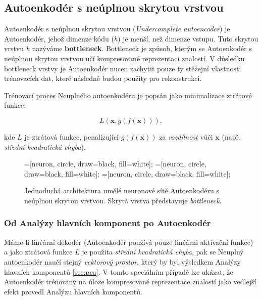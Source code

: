\subsection{Autoenkodér s neúplnou skrytou vrstvou}
\label{sec:undercomplete_autoencoder}
Autoenkodér s neúplnou skrytou vrstvou (\emph{Undercomplete autoencoder}) je Autoenkodér, jehož dimenze kódu (\emph{h}) je menší, než dimenze vstupu.
Tuto skrytou vrstvu \emph{h} nazýváme \textbf{bottleneck}. Bottleneck je způsob, kterým se Autoenkodér s neúplnou skrytou vrstvou učí kompresované reprezentaci znalostí. 
V důsledku bottleneck vrstvy je Autoenkodér nucen zachytit pouze ty stěžejní vlastnosti trénovacích dat, které následně budou použity pro rekonstrukci.

Trénovací proces Neuplného autoenkodéru je popsán jako minimalizace ztrátové funkce:

\begin{equation}
    L(\mathbf{x}, g(f(\mathbf{x}))),
\end{equation}

kde $L$ je ztrátová funkce, penalizující $g(f(\mathbf{x}))$ za \emph{rozdílnost} vůči $\mathbf{x}$ (např. \emph{střední kvadratická chyba}).


\begin{figure}[H]
    \centering
    \begin{neuralnetwork}[height=4]
        =[neuron, circle, draw=black, fill=white];
        =[neuron, circle, draw=black, fill=white];
        =[neuron, circle, draw=black, fill=white];
      
      
      
        \hiddenlayer[count=2, bias=false, title=Kód $\emph{h}$]
        \linklayers
      
        \outputlayer[count=4, title=Dekodér, text=\xout]
        \linklayers
      
      \end{neuralnetwork}
    \caption{Jednoduchá architektura umělé neuronové sítě Autoenkodéru s neúplnou skrytou vrstvou. Skrytá vrstva představuje \emph{bottleneck}.}
    \label{fig:autoencoder_bottleneck}
\end{figure}
\subsubsection{Od Analýzy hlavních komponent po Autoenkodér}
Máme-li linéární dekodér (Autoenkodér používá pouze linéárni aktivační funkce) a jako ztrátová funkce $L$ je použita \emph{střední kvadratická chyba},
pak se Neuplný autoenkodér naučí stejný \emph{vektorový prostor}, který by byl výsledkem Analýzy hlavních komponentů \autoref{sec:pca}.
V tomto speciálním případě lze ukázat, že Autoenkodér trénovaný na úloze kompresované reprezentace znalostí jako vedlejší efekt provedl Analýzu hlavních komponentů.

